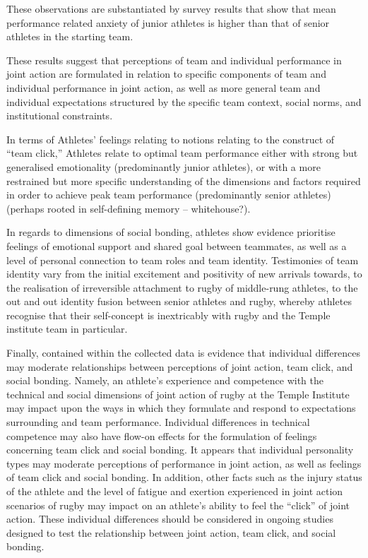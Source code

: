 These observations are substantiated by survey results that show that mean performance related anxiety of junior athletes is higher than that of senior athletes in the starting team.

These results suggest that perceptions of team and individual performance in joint action are formulated in relation to specific components of team and individual performance in joint action, as well as more general team and individual expectations structured by the specific team context, social norms, and institutional constraints.

In terms of Athletes' feelings relating to notions relating to the construct of ``team click,'' Athletes relate to optimal team performance either with strong but generalised emotionality (predominantly junior athletes), or with a more restrained but more specific understanding of the dimensions and factors required in order to achieve peak team performance (predominantly senior athletes) (perhaps rooted in self-defining memory -- whitehouse?).

In regards to dimensions of social bonding, athletes show evidence prioritise feelings of emotional support and shared goal between teammates, as well as a level of personal connection to team roles and team identity.  Testimonies of team identity vary from the initial excitement and positivity of new arrivals towards, to the realisation of irreversible attachment to rugby of middle-rung athletes, to the out and out identity fusion between senior athletes and rugby, whereby athletes recognise that their self-concept is inextricably with rugby and the Temple institute team in particular.


Finally, contained within the collected data is evidence that individual differences may moderate relationships between perceptions of joint action, team click, and social bonding.  Namely, an athlete's experience and competence with the technical and social dimensions of joint action of rugby at the Temple Institute may impact upon the ways in which they formulate and respond to expectations surrounding and team performance.  Individual differences in technical competence may also have flow-on effects for the formulation of feelings concerning team click and social bonding. It appears that individual personality types may moderate perceptions of performance in joint action, as well as feelings of team click and social bonding. In addition, other facts such as the injury status of the athlete and the level of fatigue and exertion experienced in joint action scenarios of rugby may impact on an athlete's ability to feel the ``click'' of joint action.  These individual differences should be considered in ongoing studies designed to test the relationship between joint action, team click, and social bonding.


